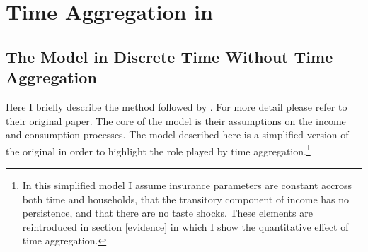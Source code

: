 \documentclass[AER]{AEA}
\begin{document}
\section{Time Aggregation in \cite{blundell_consumption_2008}} \label{BPP}

\subsection{The Model in Discrete Time Without Time Aggregation}
Here I briefly describe the method followed by \cite{blundell_consumption_2008}. For more detail please refer to their original paper. The core of the model is their assumptions on the income and consumption processes. The model described here is a simplified version of the original in order to highlight the role played by time aggregation.\footnote{In this simplified model I assume insurance parameters are constant accross both time and households, that the transitory component of income has no persistence, and that there are no taste shocks. These elements are reintroduced in section \ref{evidence} in which I show the quantitative effect of time aggregation.} 
\end{document}
